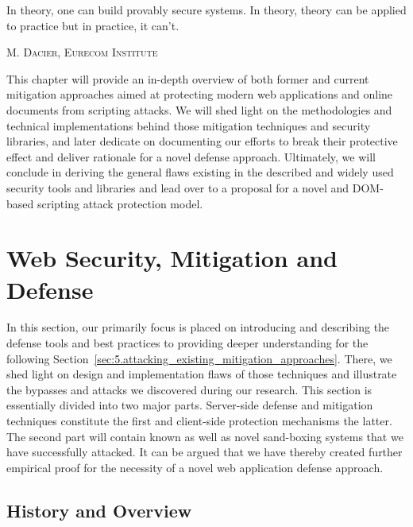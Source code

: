 \epigraph{In theory, one can build provably secure systems. In theory, theory can be applied to practice but in practice, it can't.}%
{\textsc{M. Dacier, Eurecom Institute}}

This chapter will provide an in-depth overview of both former and current mitigation approaches aimed at protecting modern web applications and online documents from scripting attacks. We will shed light on the methodologies and technical implementations behind those mitigation techniques and security libraries, and later dedicate on documenting our efforts to break their protective effect and deliver rationale for a novel defense approach. Ultimately, we will conclude in deriving the general flaws existing in the described and widely used security tools and libraries and lead over to a proposal for a novel and DOM-based scripting attack protection model.

\section{Web Security, Mitigation and Defense}
\label{sec:4.current_mitigation_approaches}

   In this section, our primarily focus is placed on introducing and describing the defense tools and best practices to providing deeper understanding for the following Section~\ref{sec:5.attacking_existing_mitigation_approaches}. There, we shed light on design and implementation flaws of those techniques and illustrate the bypasses and attacks we discovered during our research. This section is essentially divided into two major parts. Server-side defense and mitigation techniques constitute the first and client-side protection mechanisms the latter. The second part will contain known as well as novel sand-boxing systems that we have successfully attacked. It can be argued that we have thereby created further empirical proof for the necessity of a novel web application defense approach.

  \subsection{History and Overview}
  \label{subsec:4.1.cma_history_and_overview}

